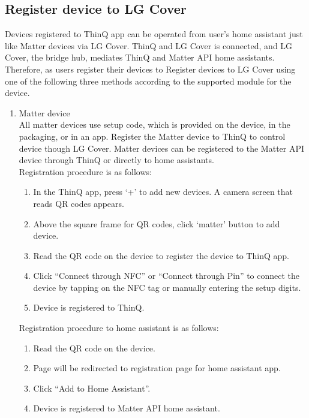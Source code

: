 \documentclass[conference]{IEEEtran}
\begin{document}
\subsection{\large{Register device to LG Cover}}
Devices registered to ThinQ app can be operated from user’s home assistant just like Matter devices via LG Cover. ThinQ and LG Cover is connected, and LG Cover, the bridge hub, mediates ThinQ and Matter API home assistants. Therefore, as users register their devices to Register devices to LG Cover using one of the following three methods according to the supported module for the device.\\
\begin{enumerate}[label=\arabic*.]
\item {\large{Matter device}}\\
All matter devices use setup code, which is provided on the device, in the packaging, or in an app. Register the Matter device to ThinQ to control device though LG Cover. Matter devices can be registered to the Matter API device through ThinQ or directly to home assistants.\\
Registration procedure is as follows:\\
\begin{enumerate}[label=\alph*.]
\item In the ThinQ app, press ‘+’ to add new devices. A camera screen that reads QR codes appears.\\
\item Above the square frame for QR codes, click ‘matter’ button to add device.\\
\item Read the QR code on the device to register the device to ThinQ app. \\
\item Click “Connect through NFC” or “Connect through Pin” to connect the device by tapping on the NFC tag or manually entering the setup digits.\\
\item Device is registered to ThinQ.\\
\end{enumerate}
Registration procedure to home assistant is as follows:\\
\begin{enumerate}[label=\alph*.]
\item Read the QR code on the device.\\
\item Page will be redirected to registration page for home assistant app.\\
\item Click “Add to Home Assistant”. \\
\item Device is registered to Matter API home assistant.\\
\end{enumerate}


\end{enumerate}
\end{document}
